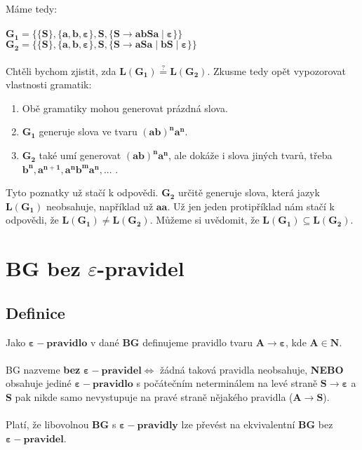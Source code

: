 \documentclass{report}
\begin{document}
\subsubsection*{}
Máme tedy:\\ \\
$\mathbf{G_1=\{\{S\},\{a,b,\varepsilon\},S,\{S \rightarrow abSa \mid \varepsilon\}\}}$ \\
$\mathbf{G_2=\{\{S\},\{a,b,\varepsilon\},S,\{S \rightarrow aSa \mid bS \mid \varepsilon\}\}}$\\ \\
Chtěli bychom zjistit, zda $\mathbf{L(G_1)\stackrel{?}{=}L(G_2)}$. Zkusme tedy opět vypozorovat vlastnosti gramatik:
\begin{enumerate}
    \item Obě gramatiky mohou generovat prázdná slova.
    \item $\mathbf{G_1}$ generuje slova ve tvaru $\mathbf{(ab)^na^n}$.
    \item $\mathbf{G_2}$ také umí generovat $\mathbf{(ab)^na^n}$, ale dokáže i slova jiných tvarů, třeba $\mathbf{b^n,a^{n+1},a^nb^ma^n,...}$ .
\end{enumerate}
Tyto poznatky už stačí k odpovědi. $\mathbf{G_2}$ určitě generuje slova, která jazyk $\mathbf{L(G_1)}$ neobsahuje, například už $\textbf{aa}$. Už jen jeden protipříklad nám stačí k odpovědi, že $\mathbf{L(G_1)\neq L(G_2)}$. Můžeme si uvědomit, že $\mathbf{L(G_1)\subseteq L(G_2)}$.
\section{BG bez $\varepsilon$-pravidel}
\subsection*{Definice}
Jako $\mathbf{\varepsilon-pravidlo}$ v dané \textbf{BG} definujeme pravidlo tvaru $\mathbf{A \rightarrow \varepsilon}$, kde $\mathbf{A \in N}$.\\ \\
BG nazveme \textbf{bez} $\mathbf{\varepsilon-pravidel \iff}$ žádná taková pravidla neobsahuje, \textbf{NEBO} obsahuje jediné $\mathbf{\varepsilon-pravidlo}$ s počátečním neterminálem na levé straně $\mathbf{S \rightarrow \varepsilon}$ a \textbf{S} pak nikde samo nevystupuje na pravé straně nějakého pravidla ($\mathbf{A \rightarrow S}$).\\ \\
Platí, že libovolnou \textbf{BG} s $\mathbf{\varepsilon-pravidly}$ lze převést na ekvivalentní \textbf{BG} bez $\mathbf{\varepsilon-pravidel}$.
\end{document}
